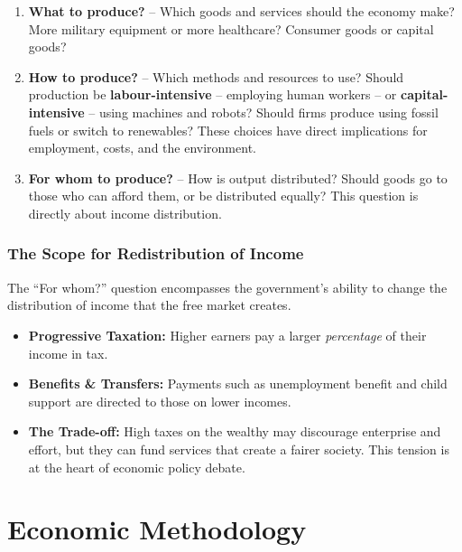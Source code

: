 \documentclass[11pt, a4paper, twoside]{book}
\begin{document}
\begin{tcolorbox}[
  enhanced,
  colback=LightBlue,
  colframe=NavyPrimary,
  arc=0pt, boxrule=1pt,
  left=10pt, right=10pt, top=8pt, bottom=8pt
]
\begin{enumerate}
  \item \textbf{What to produce?} -- Which goods and services should the economy make? More military equipment or more healthcare? Consumer goods or capital goods?
  \item \textbf{How to produce?} -- Which methods and resources to use? Should production be \textbf{labour-intensive} -- employing human workers -- or \textbf{capital-intensive} -- using machines and robots? Should firms produce using fossil fuels or switch to renewables? These choices have direct implications for employment, costs, and the environment.
  \item \textbf{For whom to produce?} -- How is output distributed? Should goods go to those who can afford them, or be distributed equally? This question is directly about income distribution.
\end{enumerate}
\end{tcolorbox}

\subsubsection{The Scope for Redistribution of Income}

The ``For whom?'' question encompasses the government's ability to change the distribution of income that the free market creates.

\begin{itemize}
  \item \textbf{Progressive Taxation:} Higher earners pay a larger \emph{percentage} of their income in tax.
  \item \textbf{Benefits \& Transfers:} Payments such as unemployment benefit and child support are directed to those on lower incomes.
  \item \textbf{The Trade-off:} High taxes on the wealthy may discourage enterprise and effort, but they can fund services that create a fairer society. This tension is at the heart of economic policy debate.
\end{itemize}

\section{Economic Methodology}
\end{document}
